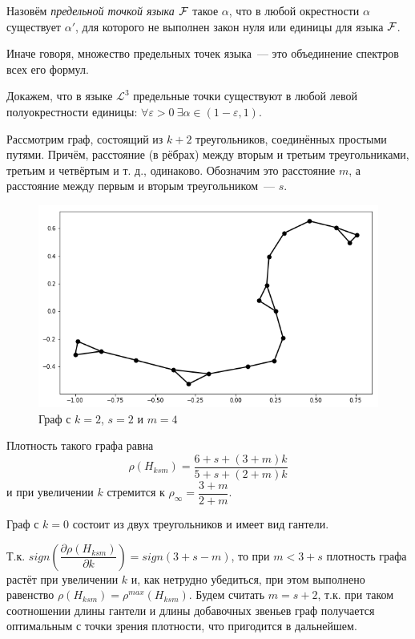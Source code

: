 \Def Назовём \textit{предельной точкой языка $\mathcal{F}$} такое $\alpha$, что в любой окрестности $\alpha$ существует $\alpha'$, для которого не выполнен закон нуля или единицы для языка $\mathcal{F}$.

Иначе говоря, множество предельных точек языка~--- это объединение спектров всех его формул.

Докажем, что в языке $\mathcal{L}^3$ предельные точки существуют в любой левой полуокрестности единицы: 
$\forall \varepsilon > 0 ~ \exists \alpha \in (1 - \varepsilon, 1)$.

Рассмотрим граф, состоящий из $k+2$ треугольников, соединённых простыми путями.
Причём, расстояние (в рёбрах) между вторым и третьим треугольниками, третьим и четвёртым и т. д., одинаково.
Обозначим это расстояние $m$, а расстояние между первым и вторым треугольником~--- $s$.

\begin{figure}[h]
    \centering
  \includegraphics[scale=0.4]{picrel/index.png}
  \caption{Граф с $k = 2$, $s = 2$ и $m = 4$}
  \label{fig:chain1}
\end{figure}

Плотность такого графа равна 
$$\rho({H_{ksm}}) = \dfrac{6+s + (3+m)k}{5+s + (2+m)k}$$
и при увеличении $k$ стремится к $\rho_\infty = \dfrac{3+m}{2+m}$.

Граф с $k=0$ состоит из двух треугольников и имеет вид гантели.

Т.к. 
$sign\left(\dfrac{\partial\rho({H_{ksm}})}{\partial k}\right) = sign(3+s-m)$,
то при $m < 3 + s$ плотность графа растёт при увеличении  $k$ и, как нетрудно убедиться, при этом выполнено равенство
$\rho({H_{ksm}}) = \rho^{max}({H_{ksm}})$.
Будем считать $m = s+2$, т.к. при таком соотношении длины гантели и длины добавочных звеньев
граф получается оптимальным с точки зрения плотности, что пригодится в дальнейшем.

